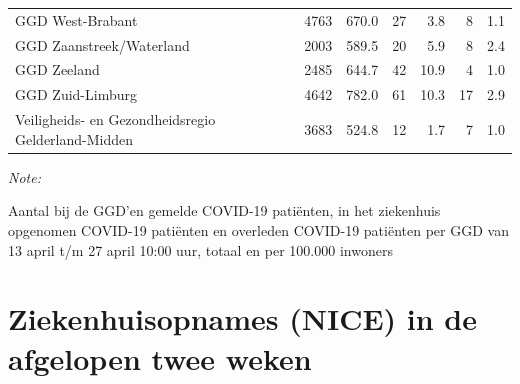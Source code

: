 \documentclass[
  english,
  man,floatsintext]{apa6}
\begin{document}
\begin{table}
\begin{threeparttable}
\begin{tabular}{lrrrrrr}
GGD West-Brabant & 4763 & 670.0 & 27 & 3.8 & 8 & 1.1\\
GGD Zaanstreek/Waterland & 2003 & 589.5 & 20 & 5.9 & 8 & 2.4\\
GGD Zeeland & 2485 & 644.7 & 42 & 10.9 & 4 & 1.0\\
GGD Zuid-Limburg & 4642 & 782.0 & 61 & 10.3 & 17 & 2.9\\
Veiligheids- en Gezondheidsregio Gelderland-Midden & 3683 & 524.8 & 12 & 1.7 & 7 & 1.0\\
\bottomrule
\end{tabular}
\begin{tablenotes}
\item \textit{Note: } 
\item Aantal bij de GGD’en gemelde COVID-19 patiënten, in het ziekenhuis opgenomen COVID-19 patiënten en overleden COVID-19 patiënten per GGD van 13 april t/m 27 april 10:00 uur, totaal en per 100.000 inwoners
\end{tablenotes}
\end{threeparttable}
\endgroup{}
\end{table}

\newpage

\hypertarget{ziekenhuisopnames-nice-in-de-afgelopen-twee-weken}{%
\section{Ziekenhuisopnames (NICE) in de afgelopen twee weken}\label{ziekenhuisopnames-nice-in-de-afgelopen-twee-weken}}
\end{document}
